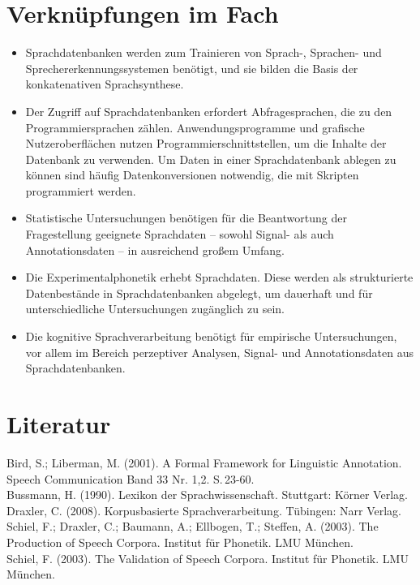 \documentclass[11pt]{book}
\begin{document}
\section{Verknüpfungen im Fach} 
\begin{itemize}
\item{Sprachdatenbanken werden zum Trainieren von Sprach-, Sprachen- und Sprechererkennungssystemen benötigt, und sie bilden die Basis der konkatenativen Sprachsynthese.}
\item{Der Zugriff auf Sprachdatenbanken erfordert Abfragesprachen, die zu den Programmiersprachen zählen. Anwendungsprogramme und grafische Nutzeroberflächen nutzen Programmierschnittstellen, um die Inhalte der Datenbank zu verwenden. Um Daten in einer Sprachdatenbank ablegen zu können sind häufig Datenkonversionen notwendig, die mit Skripten programmiert werden.}
\item{Statistische Untersuchungen benötigen für die Beantwortung der Fragestellung geeignete Sprachdaten -- sowohl Signal- als auch Annotationsdaten -- in ausreichend großem Umfang.}
\item{Die Experimentalphonetik erhebt Sprachdaten. Diese werden als strukturierte Datenbestände in Sprachdatenbanken abgelegt, um dauerhaft und für unterschiedliche Untersuchungen zugänglich zu sein.}
\item{Die kognitive Sprachverarbeitung benötigt für empirische Untersuchungen, vor allem im Bereich perzeptiver Analysen, Signal- und Annotationsdaten aus Sprachdatenbanken.} 
\end{itemize}

\section{Literatur}

Bird, S.; Liberman, M. (2001). A Formal Framework for Linguistic Annotation. Speech Communication Band 33 Nr. 1,2. S.\,23-60. \newline\\
Bussmann, H. (1990). Lexikon der Sprachwissenschaft. Stuttgart: Körner Verlag.\newline\\
Draxler, C. (2008). Korpusbasierte Sprachverarbeitung. Tübingen: Narr Verlag. \newline\\
Schiel, F.; Draxler, C.; Baumann, A.; Ellbogen, T.; Steffen, A. (2003). The Production of Speech Corpora. Institut für Phonetik. LMU München.\newline\\
Schiel, F. (2003). The Validation of Speech Corpora. Institut für Phonetik. LMU München.
\end{document}
